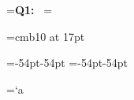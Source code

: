
=\hbox{\bf Q1: }
\parindent= %

\font\courseTitle=cmb10 at 17pt

\hoffset=-18pt
\voffset=-18pt
\hsize=-54pt-54pt
\vsize=-54pt-54pt







\newcount\questionCnt{}  %
\newcount\subquestionCnt\subquestionCnt=`a  %

\def\questionSingle{single}
\def\questionMultiple{multi}
\def\questionTF{tf}
\def\questionSub{sub}
\def\questionType{none}




\def\centerOptionMark#1{\hbox to 40pt{\hss#1\hss}}

\def\singleChoiceBox{%
    \hbox{%
        \tikz \draw (0,0) circle (3pt);%
    }%
}

\def\multiChoiceBox{%
    \lower 1.7pt
    \hbox{%
        \vrule width 0.4pt height 10pt
        \vbox{%
            \hrule width 9.2pt height 0.4pt
            \vskip 9.2pt
            \hrule width 9.2pt height 0.4pt
        }%
        \vrule width 0.4pt height 10pt
    }%
}

\def\TFBox{%
    \hbox{%
        \multiChoiceBox
        \kern 3pt
        \multiChoiceBox
    }%
}

\def\question#1#2{%
    \ifx\questionType\questionSub
        \char\subquestionCnt)
    \else
        \noindent
        {\bf Q\the\questionCnt: }%
    \fi
    #1%
    \ifx#2\empty\else~(#2{\it p})\fi
    \vfil
    \par\vskip 5pt
}

